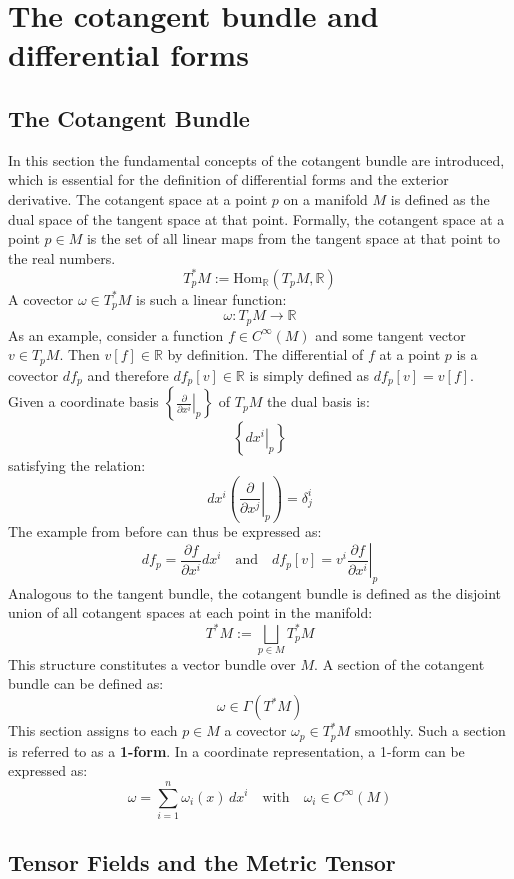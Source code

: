 \section{The cotangent bundle and differential forms}

\subsection{The Cotangent Bundle}
In this section the fundamental concepts of the cotangent bundle are introduced, which is essential for the definition of differential forms and the exterior derivative. The cotangent space at a point $p$ on a manifold $M$ is defined as the dual space of the tangent space at that point. Formally, the cotangent space at a point $p \in M$ is the set of all linear maps from the tangent space at that point to the real numbers\cite{NakaharaGeometrytopologyphysics2005}.
\[
T_p^*M := \text{Hom}_\mathbb{R}(T_p M, \mathbb{R})
\]
A covector \(\omega \in T_p^*M\) is such a linear function:
\[
\omega: T_p M \to \mathbb{R}
\]
As an example, consider a function \(f \in C^\infty(M)\) and some tangent vector $v \in T_pM$. Then $v[f] \in \mathbb{R}$ by definition. The differential of \(f\) at a point \(p\) is a covector $df_p$ and therefore $df_p[v]\in \mathbb{R}$ is simply defined as $df_p[v] = v[f]$.
Given a coordinate basis \(\left\{ \left. \frac{\partial}{\partial x^i} \right|_p \right\}\)  of \(T_p M\) the dual basis is:
\[
\left\{ \left. dx^i \right|_p \right\}
\]
satisfying the relation:
\[
dx^i\left( \left. \frac{\partial}{\partial x^j} \right|_p \right) = \delta^i_j
\]
The example from before can thus be expressed as:
\[
df_p = \frac{\partial f}{\partial x^i} dx^i \quad \text{and} \quad df_p[v] = v^i \left. \frac{\partial f}{\partial x^i} \right|_p
\]
Analogous to the tangent bundle, the cotangent bundle is defined as the disjoint union of all cotangent spaces at each point in the manifold:
\[
T^*M := \bigsqcup_{p \in M} T_p^* M
\]
This structure constitutes a vector bundle over \(M\). A section of the cotangent bundle can be defined as:
\[
\omega \in \Gamma(T^* M)
\]
This section assigns to each \(p \in M\) a covector \(\omega_p \in T_p^*M\) smoothly. Such a section is referred to as a \textbf{1-form}. In a coordinate representation, a 1-form can be expressed as:
\[
\omega = \sum_{i=1}^n \omega_i(x) \, dx^i
\quad \text{with} \quad \omega_i \in C^\infty(M)
\]

\subsection{Tensor Fields and the Metric Tensor}

